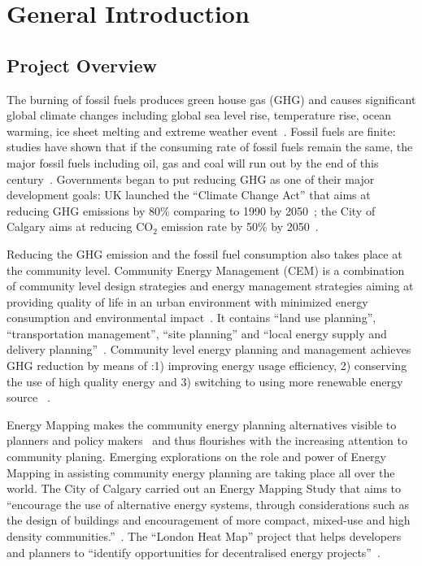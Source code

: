 
\chapter{General Introduction} %

\label{Chapter1} %



\section{Project Overview}
The burning of fossil fuels produces green house gas (GHG) and causes
significant global climate changes including global sea level rise,
temperature rise, ocean warming, ice sheet melting and extreme weather
event~\cite{NASA2015}. Fossil fuels are finite: studies have shown
that if the consuming rate of fossil fuels remain the same, the major
fossil fuels including oil, gas and coal will run out by the end of
this century~\cite{Ecotricity2015, Kathryn2015}. Governments began to
put reducing GHG as one of their major development goals: UK launched
the ``Climate Change Act'' that aims at reducing GHG emissions by 80\%
comparing to 1990 by 2050~\cite{carbonBudgetUK}; the City of Calgary
aims at reducing CO$_2$ emission rate by 50\% by
2050~\cite{aacip2009}.

Reducing the GHG emission and the fossil fuel consumption also takes
place at the community level. Community Energy Management (CEM) is a
combination of community level design strategies and energy management
strategies aiming at providing quality of life in an urban environment
with minimized energy consumption and environmental
impact~\cite{Jaccard19971065}. It contains ``land use planning'',
``transportation management'', ``site planning'' and ``local energy
supply and delivery planning''~\cite{Jaccard19971065}. Community level
energy planning and management achieves GHG reduction by means of :1)
improving energy usage efficiency, 2) conserving the use of high
quality energy and 3) switching to using more renewable energy source
~\cite{StDenis20092088}.

Energy Mapping makes the community energy planning alternatives
visible to planners and policy makers~\cite{baird2014} and thus
flourishes with the increasing attention to community
planing. Emerging explorations on the role and power of Energy Mapping
in assisting community energy planning are taking place all over the
world. The City of Calgary carried out an Energy Mapping Study that
aims to ``encourage the use of alternative energy systems, through
considerations such as the design of buildings and encouragement of
more compact, mixed-use and high density
communities.''~\cite{baird2014}. The ``London Heat Map'' project that
helps developers and planners to ``identify opportunities for
decentralised energy projects''~\cite{londonHeatMap}.

